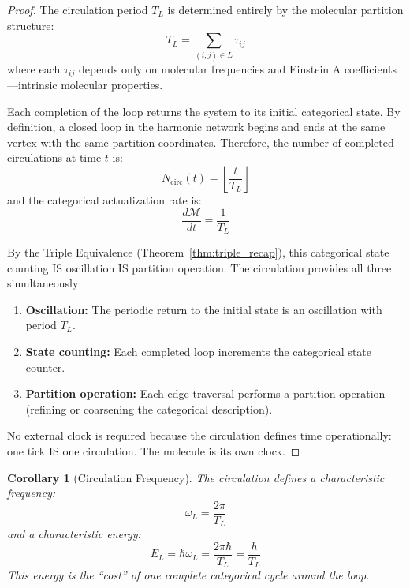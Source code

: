 \documentclass[11pt,a4paper]{article}
\newtheorem{corollary}[theorem]{Corollary}
\theoremstyle{definition}
\theoremstyle{remark}
\newcommand{\Depth}{\mathcal{M}}
\begin{document}
\begin{proof}
The circulation period $T_L$ is determined entirely by the molecular partition structure:
\begin{equation}
T_L = \sum_{(i,j) \in L} \tau_{ij}
\end{equation}
where each $\tau_{ij}$ depends only on molecular frequencies and Einstein A coefficients---intrinsic molecular properties.

Each completion of the loop returns the system to its initial categorical state. By definition, a closed loop in the harmonic network begins and ends at the same vertex with the same partition coordinates. Therefore, the number of completed circulations at time $t$ is:
\begin{equation}
N_{\mathrm{circ}}(t) = \left\lfloor \frac{t}{T_L} \right\rfloor
\end{equation}
and the categorical actualization rate is:
\begin{equation}
\frac{d\Depth}{dt} = \frac{1}{T_L}
\end{equation}

By the Triple Equivalence (Theorem~\ref{thm:triple_recap}), this categorical state counting IS oscillation IS partition operation. The circulation provides all three simultaneously:
\begin{enumerate}[nosep]
\item \textbf{Oscillation:} The periodic return to the initial state is an oscillation with period $T_L$.
\item \textbf{State counting:} Each completed loop increments the categorical state counter.
\item \textbf{Partition operation:} Each edge traversal performs a partition operation (refining or coarsening the categorical description).
\end{enumerate}

No external clock is required because the circulation defines time operationally: one tick IS one circulation. The molecule is its own clock.
\end{proof}

\begin{corollary}[Circulation Frequency]
\label{cor:circulation_frequency}
The circulation defines a characteristic frequency:
\begin{equation}
\omega_L = \frac{2\pi}{T_L}
\end{equation}
and a characteristic energy:
\begin{equation}
E_L = \hbar\omega_L = \frac{2\pi\hbar}{T_L} = \frac{h}{T_L}
\end{equation}
This energy is the ``cost'' of one complete categorical cycle around the loop.
\end{corollary}
\end{document}
